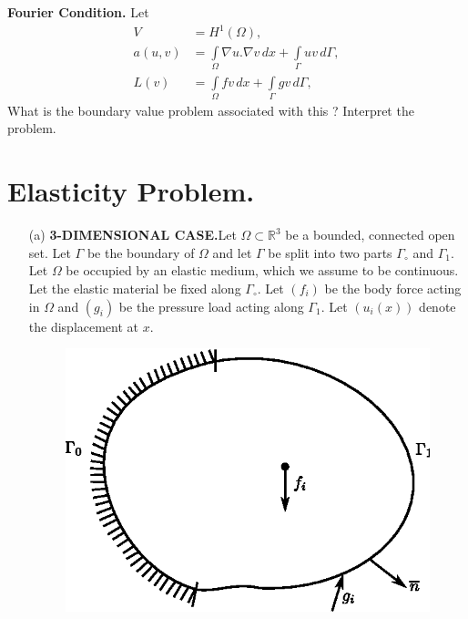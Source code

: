 \begin{exer}\label{chap2:exr2}
{\bf Fourier Condition.} Let 
\begin{align*}
V &= H^1(\Omega),\\
a(u, v) &= \int\limits_\Omega\nabla u.\nabla v\,dx +
\int\limits_\Gamma uv\,d\Gamma,\\
L(v) &= \int\limits_\Omega fv\,dx + \int\limits_\Gamma gv\,d\Gamma,%
\end{align*}
What is the boundary value problem associated with this \@? Interpret
the problem.
\end{exer}

\section{Elasticity Problem.}\label{chap2:ssec2.5}
\begin{itemize}
\item [(a)] {\bf 3-DIMENSIONAL CASE.}\pageoriginale Let $\Omega
  \subset \mathbb{R}^3$ be a bounded, connected open set. Let $\Gamma$
  be the boundary of $\Omega$ and let $\Gamma$ be split into two parts
  $\Gamma_\circ$ and $\Gamma_1$. Let $\Omega$ be occupied by an
  elastic medium, which we assume to be continuous. Let the elastic
  material be fixed along $\Gamma_\circ$. Let $(f_i)$ be the body
  force acting in $\Omega$ and $(g_i)$ be the pressure load acting
  along $\Gamma_1$. Let $(u_i(x))$ denote the displacement at $x$.
\begin{figure}[H]
\centering
\includegraphics{figure/fig2.3.eps}
\caption{}\label{fig2.3}
\end{figure}



\end{itemize}
